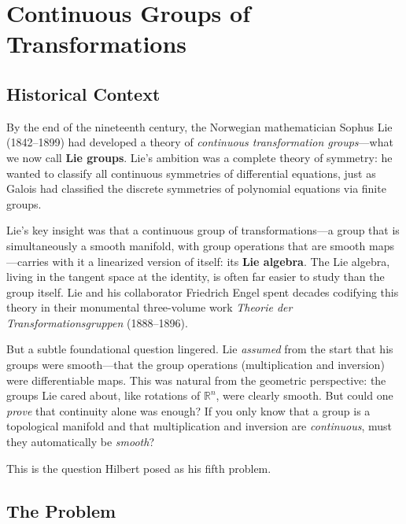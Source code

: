 
\chapter{Continuous Groups of Transformations}

\section{Historical Context}

By the end of the nineteenth century, the Norwegian mathematician Sophus Lie (1842--1899) had developed a theory of \emph{continuous transformation groups}---what we now call \textbf{Lie groups}. Lie's ambition was a complete theory of symmetry: he wanted to classify all continuous symmetries of differential equations, just as Galois had classified the discrete symmetries of polynomial equations via finite groups.

Lie's key insight was that a continuous group of transformations---a group that is simultaneously a smooth manifold, with group operations that are smooth maps---carries with it a linearized version of itself: its \textbf{Lie algebra}. The Lie algebra, living in the tangent space at the identity, is often far easier to study than the group itself. Lie and his collaborator Friedrich Engel spent decades codifying this theory in their monumental three-volume work \emph{Theorie der Transformationsgruppen} (1888--1896).

But a subtle foundational question lingered. Lie \emph{assumed} from the start that his groups were smooth---that the group operations (multiplication and inversion) were differentiable maps. This was natural from the geometric perspective: the groups Lie cared about, like rotations of $\mathbb{R}^n$, were clearly smooth. But could one \emph{prove} that continuity alone was enough? If you only know that a group is a topological manifold and that multiplication and inversion are \emph{continuous}, must they automatically be \emph{smooth}?

This is the question Hilbert posed as his fifth problem.

\section{The Problem}

